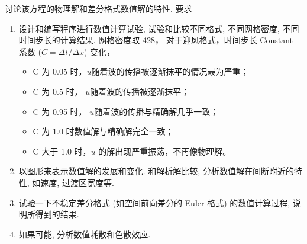 \documentclass[10.5pt
]{article}
\begin{document}
讨论该方程的物理解和差分格式数值解的特性. 要求
\begin{enumerate}
\item
  设计和编写程序进行数值计算试验, 试验和比较不同格式, 不同网格密度, 不同时间步长的计算结果.
网格密度取 428，
对于迎风格式，时间步长 Constant 系数 ($C = \Delta t / \Delta x$) 变化，
\begin{itemize}
	\item C 为 0.05 时，$u$随着波的传播被逐渐抹平的情况最为严重；
	\item C 为 0.5 时， $u$随着波的传播被逐渐抹平；
	\item C 为 0.95 时， $u$随着波的传播与精确解几乎一致；
	\item C 为 1.0 时数值解与精确解完全一致；
	\item C 大于 1.0 时，$u$ 的解出现严重振荡，不再像物理解。
\end{itemize}

\item
  以图形来表示数值解的发展和变化. 和解析解比较, 分析数值解在间断附近的特性, 如速度, 过渡区宽度等.
\item
  试验一下不稳定差分格式 (如空间前向差分的 Euler 格式) 的数值计算过程, 说明所得到的结果.
\item
  如果可能, 分析数值耗散和色散效应.
\end{enumerate}
\end{document}
